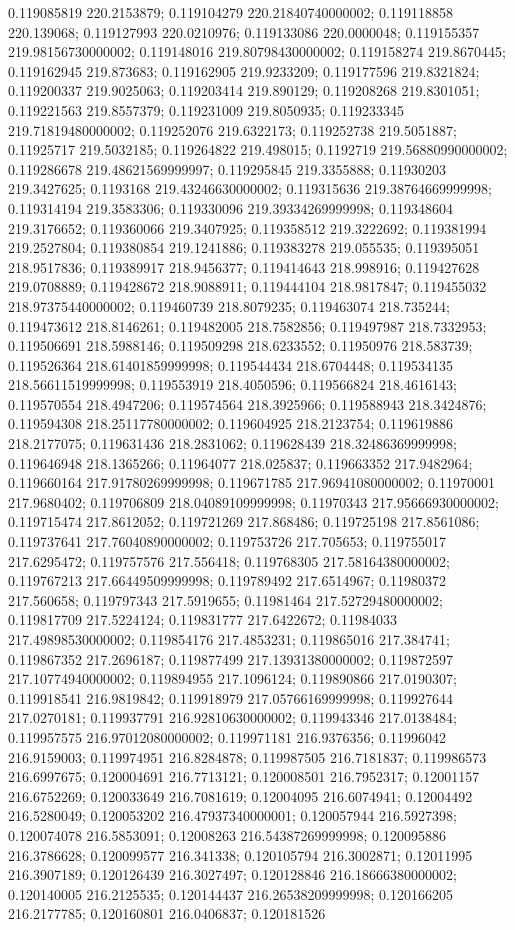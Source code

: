 0.119085819 220.2153879; 0.119104279 220.21840740000002; 0.119118858 220.139068; 0.119127993 220.0210976; 0.119133086 220.0000048; 0.119155357 219.98156730000002; 0.119148016 219.80798430000002; 0.119158274 219.8670445; 0.119162945 219.873683; 0.119162905 219.9233209; 0.119177596 219.8321824; 0.119200337 219.9025063; 0.119203414 219.890129; 0.119208268 219.8301051; 0.119221563 219.8557379; 0.119231009 219.8050935; 0.119233345 219.71819480000002; 0.119252076 219.6322173; 0.119252738 219.5051887; 0.11925717 219.5032185; 0.119264822 219.498015; 0.1192719 219.56880990000002; 0.119286678 219.48621569999997; 0.119295845 219.3355888; 0.11930203 219.3427625; 0.1193168 219.43246630000002; 0.119315636 219.38764669999998; 0.119314194 219.3583306; 0.119330096 219.39334269999998; 0.119348604 219.3176652; 0.119360066 219.3407925; 0.119358512 219.3222692; 0.119381994 219.2527804; 0.119380854 219.1241886; 0.119383278 219.055535; 0.119395051 218.9517836; 0.119389917 218.9456377; 0.119414643 218.998916; 0.119427628 219.0708889; 0.119428672 218.9088911; 0.119444104 218.9817847; 0.119455032 218.97375440000002; 0.119460739 218.8079235; 0.119463074 218.735244; 0.119473612 218.8146261; 0.119482005 218.7582856; 0.119497987 218.7332953; 0.119506691 218.5988146; 0.119509298 218.6233552; 0.11950976 218.583739; 0.119526364 218.61401859999998; 0.119544434 218.6704448; 0.119534135 218.56611519999998; 0.119553919 218.4050596; 0.119566824 218.4616143; 0.119570554 218.4947206; 0.119574564 218.3925966; 0.119588943 218.3424876; 0.119594308 218.25117780000002; 0.119604925 218.2123754; 0.119619886 218.2177075; 0.119631436 218.2831062; 0.119628439 218.32486369999998; 0.119646948 218.1365266; 0.11964077 218.025837; 0.119663352 217.9482964; 0.119660164 217.91780269999998; 0.119671785 217.96941080000002; 0.11970001 217.9680402; 0.119706809 218.04089109999998; 0.11970343 217.95666930000002; 0.119715474 217.8612052; 0.119721269 217.868486; 0.119725198 217.8561086; 0.119737641 217.76040890000002; 0.119753726 217.705653; 0.119755017 217.6295472; 0.119757576 217.556418; 0.119768305 217.58164380000002; 0.119767213 217.66449509999998; 0.119789492 217.6514967; 0.11980372 217.560658; 0.119797343 217.5919655; 0.11981464 217.52729480000002; 0.119817709 217.5224124; 0.119831777 217.6422672; 0.11984033 217.49898530000002; 0.119854176 217.4853231; 0.119865016 217.384741; 0.119867352 217.2696187; 0.119877499 217.13931380000002; 0.119872597 217.10774940000002; 0.119894955 217.1096124; 0.119890866 217.0190307; 0.119918541 216.9819842; 0.119918979 217.05766169999998; 0.119927644 217.0270181; 0.119937791 216.92810630000002; 0.119943346 217.0138484; 0.119957575 216.97012080000002; 0.119971181 216.9376356; 0.11996042 216.9159003; 0.119974951 216.8284878; 0.119987505 216.7181837; 0.119986573 216.6997675; 0.120004691 216.7713121; 0.120008501 216.7952317; 0.12001157 216.6752269; 0.120033649 216.7081619; 0.12004095 216.6074941; 0.12004492 216.5280049; 0.120053202 216.47937340000001; 0.120057944 216.5927398; 0.120074078 216.5853091; 0.12008263 216.54387269999998; 0.120095886 216.3786628; 0.120099577 216.341338; 0.120105794 216.3002871; 0.12011995 216.3907189; 0.120126439 216.3027497; 0.120128846 216.18666380000002; 0.120140005 216.2125535; 0.120144437 216.26538209999998; 0.120166205 216.2177785; 0.120160801 216.0406837; 0.120181526 